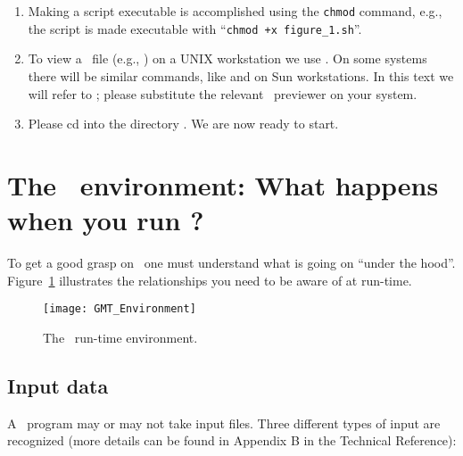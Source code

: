 \documentclass[11pt]{report}
\begin{document}
\begin{enumerate}
\item Making a script executable is accomplished using the \texttt{chmod}
command, e.g., the script  is made executable
with ``\texttt{chmod +x figure\_1.sh}''.

\item To view a \PS\ file (e.g., ) on a UNIX workstation
we use  .  On some systems there
will be similar commands, like  and 
on Sun workstations.  In this text we will refer to
; please substitute the relevant \PS\ previewer
on your system.

\item Please cd into the directory .  We are
now ready to start.

\end{enumerate}

\section{The \gmt\ environment: What happens when you run \gmt ?}

To get a good grasp on \GMT\ one must understand what is going on ``under
the hood''.  Figure~\ref{fig:GMT_Environment} illustrates the relationships
you need to be aware of at run-time.

\begin{figure}[h]
   \centering\texttt{[image: GMT\_Environment]}
   \caption{The \gmt\ run-time environment.}
   \label{fig:GMT_Environment}
\end{figure}

\subsection{Input data}
A \GMT\ program may or may not take input files.  Three different
types of input are recognized (more details can be found in Appendix
B in the Technical Reference):
\end{document}
